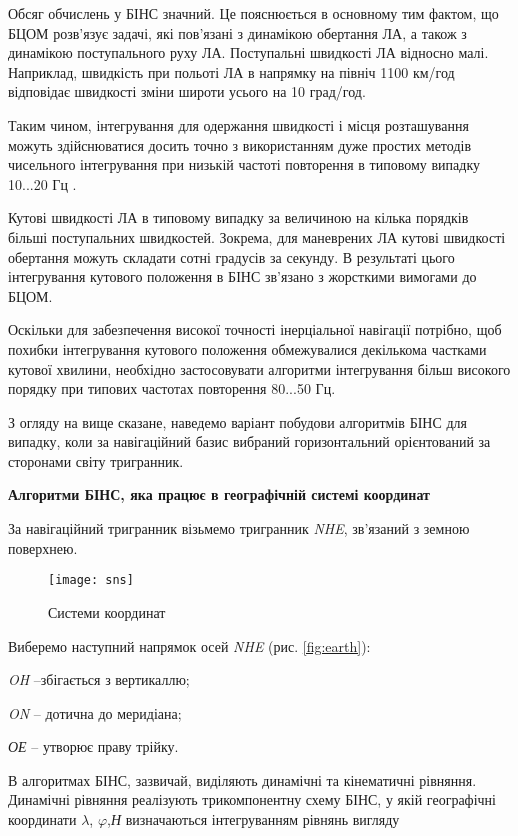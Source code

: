Обсяг обчислень у БІНС значний. Це пояснюється в основному тим фактом, що БЦОМ розв'язує 
задачі, які пов'язані з динамікою обертання ЛА, а також з динамікою поступального 
руху ЛА. Поступальні швидкості ЛА відносно малі. Наприклад, швидкість при польоті 
ЛА в напрямку на північ 1100 км/год відповідає швидкості зміни широти усього на 10 
град/год.

Таким чином, інтегрування для одержання швидкості і місця розташування можуть здійснюватися 
досить точно з використанням дуже простих методів чисельного інтегрування при низькій 
частоті повторення   в типовому випадку 10...20 Гц .

Кутові швидкості ЛА в типовому випадку за величиною на кілька порядків більші поступальних 
швидкостей. Зокрема, для маневрених ЛА кутові швидкості обертання можуть складати 
сотні градусів за секунду. В результаті цього інтегрування кутового положення в БІНС 
зв'язано з жорсткими вимогами до БЦОМ.

Оскільки для забезпечення високої точності інерціальної навігації потрібно, щоб похибки 
інтегрування кутового положення обмежувалися декількома частками кутової хвилини, 
необхідно застосовувати алгоритми інтегрування більш високого порядку при типових 
частотах повторення  80...50 Гц. 

З огляду на вище сказане, наведемо  варіант побудови алгоритмів БІНС для випадку, 
коли за навігаційний базис вибраний горизонтальний орієнтований за сторонами світу 
тригранник.
\vspace{5mm}

\textbf{Алгоритми БІНС, яка працює в географічній системі координат}

За навігаційний тригранник візьмемо тригранник \textit{NHE}, зв'язаний з земною поверхнею.
\begin{figure}[here]
\centering
\texttt{[image: sns]}
\caption{Системи координат}
\label{fig:coordinat}
\end{figure} 
Виберемо наступний напрямок осей   \textit{NHE} (рис. \ref{fig:earth}):
\begin{ESKDexplanation}
\item \textit{OH} --збігається з вертикаллю;
\item \textit{ON} -- дотична до меридіана;
\item \textit{ОЕ} -- утворює праву трійку.
\end{ESKDexplanation}
В алгоритмах БІНС, зазвичай, виділяють динамічні та кінематичні рівняння. 
Динамічні рівняння реалізують трикомпонентну схему БІНС, у якій географічні координати  $\lambda$, 
$\varphi$,\textit{Н} визначаються інтегруванням рівнянь вигляду

